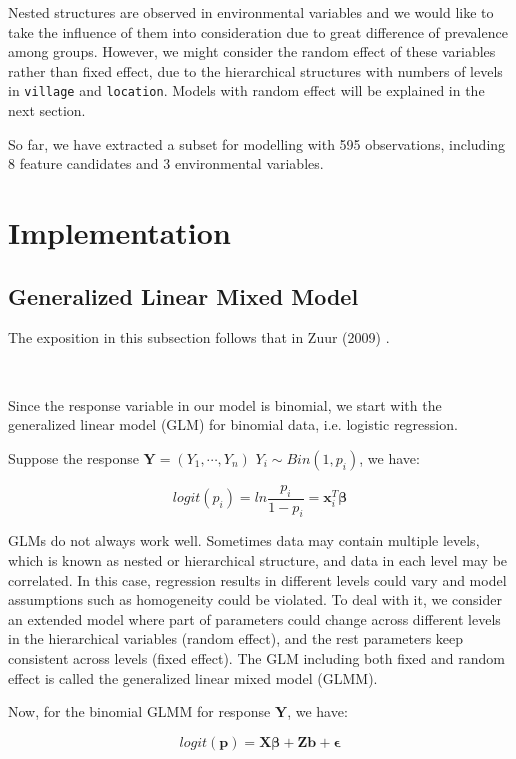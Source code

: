 \documentclass[11pt,twoside]{article}
\numberwithin{Theorem}{section}
\numberwithin{Definition}{section}
\numberwithin{Lemma}{section}
\numberwithin{Algorithm}{section}
\numberwithin{equation}{section}
\begin{document}
Nested structures are observed in environmental variables and we would like to take the influence of them into consideration due to great difference of prevalence among groups. However, we might consider the random effect of these variables rather than fixed effect, due to the hierarchical structures with numbers of levels in \texttt{village} and \texttt{location}. Models with random effect will be explained in the next section.

So far, we have extracted a subset for modelling with 595 observations, including 8 feature candidates and 3 environmental variables.

\clearpage

\section{Implementation}
\label{sec:implementation}

\subsection{Generalized Linear Mixed Model}

The exposition in this subsection follows that in Zuur (2009) \cite{zuur2009mixed}.

\

Since the response variable in our model is binomial, we start with the generalized linear model (GLM) for binomial data, i.e. logistic regression. 

Suppose the response $\boldsymbol{Y} = (Y_1, \cdots, Y_n)$ $Y_i \sim Bin(1, p_i)$, we have: 

$$logit(p_i) = ln \frac{p_i}{1-p_i} = \boldsymbol{x}_i^T\boldsymbol{\beta}$$

GLMs do not always work well. Sometimes data may contain multiple levels, which is known as nested or hierarchical structure, and data in each level may be correlated. In this case, regression results in different levels could vary and model assumptions such as homogeneity could be violated. To deal with it, we consider an extended model where part of parameters could change across different levels in the hierarchical variables (random effect), and the rest parameters keep consistent across levels (fixed effect). The GLM including both fixed and random effect is called the generalized linear mixed model (GLMM). 

Now, for the binomial GLMM for response $\boldsymbol{Y}$, we have:

$$logit(\boldsymbol{p})  = \boldsymbol{X}\boldsymbol{\beta} + \boldsymbol{Z}\boldsymbol{b} + \boldsymbol{\epsilon}$$
\end{document}
